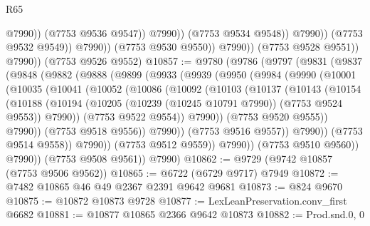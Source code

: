 \begin{lexlean}{R65}
\begin{coremodule}
{                                      @7990))
                                  (@7753 @9536 @9547))
                                @7990))
                            (@7753 @9534 @9548))
                          @7990))
                      (@7753 @9532 @9549))
                    @7990))
                (@7753 @9530 @9550))
              @7990))
          (@7753 @9528 @9551))
        @7990))
    (@7753 @9526 @9552)
@10857 := @9780
    (@9786
      (@9797
        (@9831
          (@9837
            (@9848
              (@9882
                (@9888
                  (@9899
                    (@9933
                      (@9939
                        (@9950
                          (@9984
                            (@9990
                              (@10001
                                (@10035
                                  (@10041
                                    (@10052
                                      (@10086
                                        (@10092
                                          (@10103
                                            (@10137
                                              (@10143
                                                (@10154
                                                  (@10188
                                                    (@10194
                                                      (@10205
                                                        (@10239 (@10245 @10791 @7990))
                                                        (@7753 @9524 @9553))
                                                      @7990))
                                                  (@7753 @9522 @9554))
                                                @7990))
                                            (@7753 @9520 @9555))
                                          @7990))
                                      (@7753 @9518 @9556))
                                    @7990))
                                (@7753 @9516 @9557))
                              @7990))
                          (@7753 @9514 @9558))
                        @7990))
                    (@7753 @9512 @9559))
                  @7990))
              (@7753 @9510 @9560))
            @7990))
        (@7753 @9508 @9561))
      @7990)
@10862 := @9729 (@9742 @10857 (@7753 @9506 @9562))
@10865 := @6722 (@6729 @9717) @7949
@10872 := @7482 @10865 @46 @49 @2367 @2391 @9642 @9681
@10873 := @824 @9670
@10875 := @10872 @10873 @9728
@10877 := LexLeanPreservation.conv_first @6682
@10881 := @10877 @10865 @2366 @9642 @10873
@10882 := Prod.snd.{0, 0}
}
\end{coremodule}
\end{lexlean}
